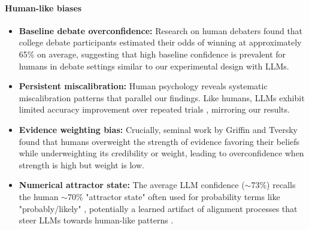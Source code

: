 \documentclass{article}
\begin{document}
\paragraph{Human-like biases}
\begin{itemize}
    \item \textbf{Baseline debate overconfidence:} Research on human debaters \citep{RePEc:sip:dpaper:06-042} found that college debate participants estimated their odds of winning at approximately 65\% on average, suggesting that high baseline confidence is prevalent for humans in debate settings similar to our experimental design with LLMs.

    \item \textbf{Persistent miscalibration:} Human psychology reveals systematic miscalibration patterns that parallel our findings. Like humans, LLMs exhibit limited accuracy improvement over repeated trials \citep{Moore2008}, mirroring our results.

    \item \textbf{Evidence weighting bias:} Crucially, seminal work by Griffin and Tversky \citep{GriffinTversky1992} found that humans overweight the strength of evidence favoring their beliefs while underweighting its credibility or weight, leading to overconfidence when strength is high but weight is low.

    \item \textbf{Numerical attractor state:} The average LLM confidence ($\sim$73\%) recalls the human $\sim$70\% "attractor state" often used for probability terms like "probably/likely" \citep{Hashim2024,Mandel2019}, potentially a learned artifact of alignment processes that steer LLMs towards human-like patterns \citep{west2025basemodelsbeataligned}.
\end{itemize}
\end{document}
